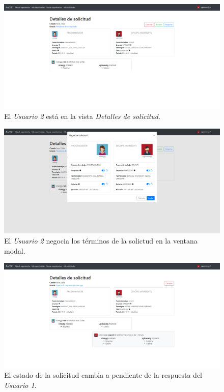 \documentclass[a4paper, 12pt]{book}
\begin{document}
    \begin{figure}
        \centering
        \includegraphics[width=15cm, keepaspectratio]{img/6.2.png}
        \caption{El \emph{Usuario 2} está en la vista \emph{Detalles de solicitud}.}
        \label{fig:use_cases_6_2}
    \end{figure}

    \begin{figure}
        \centering
        \includegraphics[width=15cm, keepaspectratio]{img/6.3.png}
        \caption{El \emph{Usuario 2} negocia los términos de la solictud en la ventana modal.}
        \label{fig:use_cases_6_3}
    \end{figure}

    \begin{figure}
        \centering
        \includegraphics[width=15cm, keepaspectratio]{img/6.4.png}
        \caption{El estado de la solicitud cambia a pendiente de la respuesta del \emph{Usuario 1}.}
        \label{fig:use_cases_6_4}
    \end{figure}
\end{document}
